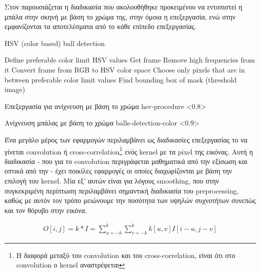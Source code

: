 Στον  παρουσιάζεται η διαδικασία που ακολουθήθηκε προκειμένου να ε\-ντο\-πι\-στεί η μπάλα στην σκηνή με βάση το χρώμα της, στην  όμοια η επεξεργασία, ενώ στην  ε\-μφα\-νί\-ζο\-νται τα αποτελέσματα από το κάθε επίπεδο επεξεργασίας.

\begin{algorithm}[H]
	\caption[HSV (color based) ball detection]{HSV (color based) ball detection}\label{alg:hsv-detect}
	\begin{algorithmic}[1]
            \State Define preferable color limit HSV values
                \State Get frame
                \State Remove high frequencies from it
                \State Convert frame from RGB to HSV color space
                \State Choose only pixels that are in between preferable color limit values 
                \State Find bounding box of mask (threshold image)
            \EndFor
	\end{algorithmic}
\end{algorithm}

%
{Επεξεργασία για ανίχνευση με βάση το χρώμα}%
{hsv-procedure}%
<0.8>

%
{Ανίχνευση μπάλας με βάση το χρώμα}%
{balls-detection-color}%
<0.9>

Ένα μεγάλο μέρος των  εφαρμογών περιλαμβάνει ως διαδικασίες επεξεργασίας το να γίνεται convolution ή cross-correlation\footnote{Η διαφορά μεταξύ του convolution και του cross-correlation, είναι ότι στο convolution ο kernel αναστρέφεται} ενός kernel με τα pixel της εικόνας. Αυτή η διαδικασία - που για το convolution περιγράφεται μαθηματικά από την εξίσωση  και οπτικά από την  - έχει ποικίλες εφαρμογές οι οποίες διαχωρίζονται με βάση την επιλογή του kernel. Μία εξ' αυτών είναι για λόγους smoothing, που στην συγκεκριμένη περίπτωση περιλαμβάνει σημαντική διαδικασία του preprocessing, καθώς με αυτόν τον τρόπο μειώνουμε την ποσότητα των υψηλών συχνοτήτων συνεπώς και τον θόρυβο στην εικόνα.

\begin{gather}
	O[i,j] = k * I = \sum_{u=-k}^{k} \sum_{v=-k}^{k} k[u,v]I[i-u,j-v] \label{eq:cross-correlation}
\end{gather}

